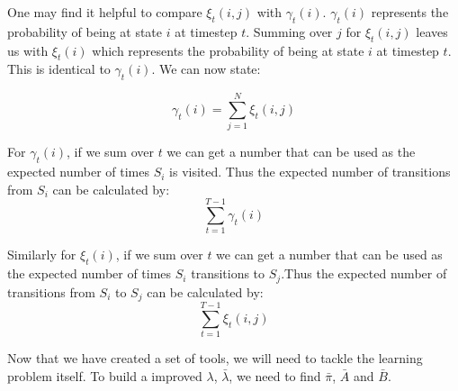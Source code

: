     One may find it helpful to compare $\xi_t(i,j)$ with $\gamma_t(i)$. $\gamma_t(i)$ represents the probability of being at state $i$ at timestep $t$. Summing over $j$ for $\xi_t(i,j)$ leaves us with $\xi_t(i)$ which represents the probability of being at state $i$ at timestep $t$. This is identical to $\gamma_t(i)$. We can now state: 

    \begin{equation}
        \gamma_t(i) = \sum_{j=1}^N \xi_t(i,j)
    \end{equation}

    For $\gamma_t(i)$, if we sum over $t$ we can get a number that can be used as the expected number of times $S_i$ is visited. Thus the expected number of transitions from $S_i$ can be calculated by:
    \begin{equation}
        \sum_{t=1}^{T-1} \gamma_t(i)
    \end{equation}

    Similarly for $\xi_t(i)$, if we sum over $t$ we can get a number that can be used as the expected number of times $S_i$ transitions to $S_j$.Thus the expected number of transitions from $S_i$ to $S_j$ can be calculated by:
    \begin{equation}
        \sum_{t=1}^{T-1} \xi_t(i,j)
    \end{equation}



    Now that we have created a set of tools, we will need to tackle the learning problem itself. To build a improved $\lambda$, $\bar{\lambda}$, we need to find $\bar{\pi}$, $\bar{A}$ and $\bar{B}$.

